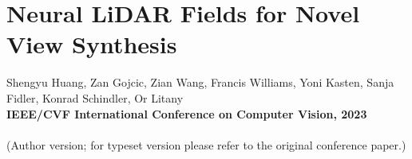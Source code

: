 \chapter[Neural LiDAR Fields for Novel View Synthesis]{Neural LiDAR Fields for Novel View Synthesis}
\label{chap:iccv23}

Shengyu Huang, Zan Gojcic, Zian Wang, Francis Williams, Yoni Kasten, Sanja Fidler, Konrad Schindler, Or Litany\\
\textbf{IEEE/CVF International Conference on Computer Vision, 2023}\\
\\
(Author version; for typeset version please refer to the original conference paper.)\\

\providecommand{\subdir}{.}
\graphicspath{{\subdir/}}


\newpage







\newpage
\newcommand{\manuallabel}[2]{\def\@currentlabel{#2}\label{#1}}
\makeatother
\manuallabel{eq:iccv_loss_function}{Eq.~(15)}
